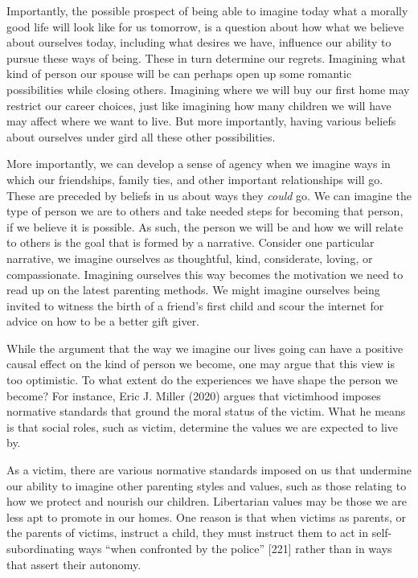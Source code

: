 \documentclass[
  letterpaper,
  DIV=11,
  numbers=noendperiod]{scrreprt}
\begin{document}
\begin{tcolorbox}[enhanced jigsaw, arc=.35mm, breakable, rightrule=.15mm, colback=white, colframe=quarto-callout-important-color-frame, bottomrule=.15mm, leftrule=.75mm, opacityback=0, toprule=.15mm, left=2mm]
\begin{tcolorbox}[enhanced jigsaw, arc=.35mm, breakable, rightrule=.15mm, colback=white, colframe=quarto-callout-tip-color-frame, bottomrule=.15mm, leftrule=.75mm, opacityback=0, toprule=.15mm, left=2mm]
Importantly, the possible prospect of being able to imagine today what a
morally good life will look like for us tomorrow, is a question about
how what we believe about ourselves today, including what desires we
have, influence our ability to pursue these ways of being. These in turn
determine our regrets. Imagining what kind of person our spouse will be
can perhaps open up some romantic possibilities while closing others.
Imagining where we will buy our first home may restrict our career
choices, just like imagining how many children we will have may affect
where we want to live. But more importantly, having various beliefs
about ourselves under gird all these other possibilities.

More importantly, we can develop a sense of agency when we imagine ways
in which our friendships, family ties, and other important relationships
will go. These are preceded by beliefs in us about ways they
\emph{could} go. We can imagine the type of person we are to others and
take needed steps for becoming that person, if we believe it is
possible. As such, the person we will be and how we will relate to
others is the goal that is formed by a narrative. Consider one
particular narrative, we imagine ourselves as thoughtful, kind,
considerate, loving, or compassionate. Imagining ourselves this way
becomes the motivation we need to read up on the latest parenting
methods. We might imagine ourselves being invited to witness the birth
of a friend's first child and scour the internet for advice on how to be
a better gift giver.

While the argument that the way we imagine our lives going can have a
positive causal effect on the kind of person we become, one may argue
that this view is too optimistic. To what extent do the experiences we
have shape the person we become? For instance, Eric J. Miller (2020)
argues that victimhood imposes normative standards that ground the moral
status of the victim. What he means is that social roles, such as
victim, determine the values we are expected to live by.

As a victim, there are various normative standards imposed on us that
undermine our ability to imagine other parenting styles and values, such
as those relating to how we protect and nourish our children.
Libertarian values may be those we are less apt to promote in our homes.
One reason is that when victims as parents, or the parents of victims,
instruct a child, they must instruct them to act in self-subordinating
ways ``when confronted by the police'' {[}221{]} rather than in ways
that assert their autonomy.


\end{tcolorbox}
\end{tcolorbox}
\end{document}
